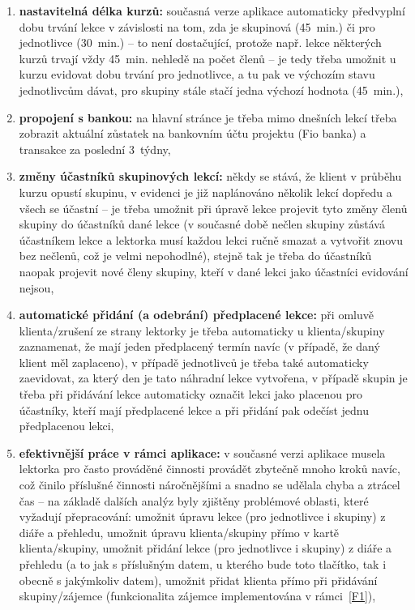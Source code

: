 \begin{enumerate}[label=\textbf{F\arabic*}]
    \item \label{F7} \textbf{nastavitelná délka kurzů:} současná verze aplikace automaticky předvyplní dobu trvání lekce v závislosti na tom, zda je skupinová (45~min.) či pro jednotlivce (30~min.) -- to není dostačující, protože např. lekce některých kurzů trvají vždy 45~min. nehledě na počet členů -- je tedy třeba umožnit u kurzu evidovat dobu trvání pro jednotlivce, a tu pak ve výchozím stavu jednotlivcům dávat, pro skupiny stále stačí jedna výchozí hodnota (45~min.),
    \item \label{F8} \textbf{propojení s bankou:} na hlavní stránce je třeba mimo dnešních lekcí třeba zobrazit aktuální zůstatek na bankovním účtu projektu (Fio banka) a transakce za poslední 3~týdny,
    \item \label{F9} \textbf{změny účastníků skupinových lekcí:} někdy se stává, že klient v průběhu kurzu opustí skupinu, v evidenci je již naplánováno několik lekcí dopředu a všech se účastní -- je třeba umožnit při úpravě lekce projevit tyto změny členů skupiny do účastníků dané lekce (v současné době nečlen skupiny zůstává účastníkem lekce a lektorka musí každou lekci ručně smazat a vytvořit znovu bez nečlenů, což je velmi nepohodlné), stejně tak je třeba do účastníků naopak projevit nové členy skupiny, kteří v dané lekci jako účastníci evidování nejsou,
    \item \label{F10} \textbf{automatické přidání (a odebrání) předplacené lekce:} při omluvě klienta/zrušení ze strany lektorky je třeba automaticky u klienta/skupiny zaznamenat, že mají jeden předplacený termín navíc (v případě, že daný klient měl zaplaceno), v případě jednotlivců je třeba také automaticky zaevidovat, za který den je tato náhradní lekce vytvořena, v případě skupin je třeba při přidávání lekce automaticky označit lekci jako placenou pro účastníky, kteří mají předplacené lekce a při přidání pak odečíst jednu předplacenou lekci,
    \item \label{F11} \textbf{efektivnější práce v rámci aplikace:} v současné verzi aplikace musela lektorka pro často prováděné činnosti provádět zbytečně mnoho kroků navíc, což činilo příslušné činnosti náročnějšími a snadno se udělala chyba a ztrácel čas -- na základě dalších analýz byly zjištěny problémové oblasti, které vyžadují přepracování: umožnit úpravu lekce (pro jednotlivce i skupiny) z diáře a přehledu, umožnit úpravu klienta/skupiny přímo v kartě klienta/skupiny, umožnit přidání lekce (pro jednotlivce i skupiny) z diáře a přehledu (a to jak s příslušným datem, u kterého bude toto tlačítko, tak i obecně s jakýmkoliv datem), umožnit přidat klienta přímo při přidávání skupiny/zájemce (funkcionalita zájemce implementována v rámci~\ref{F1}),

\end{enumerate}
